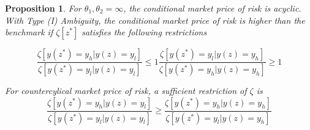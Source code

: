 \documentclass[12pt]{article}
\newtheorem{proposition}{Proposition}
\begin{document}
\begin{proposition}
\label{propo-7}
For $\theta_1,\theta_2=\infty$, the conditional market price of risk is acyclic. With Type (I) Ambiguity, the conditional market price of risk is higher than the benchmark if $\zeta[z^*]$ satisfies the following restrictions

\begin{subequations}
\label{eq:mprgreaterthanbenchmarkcondition}
\begin{equation}
	\frac{\zeta[y(z^*)=y_h|y(z)=y_l]}{\zeta[y(z^*)=y_l|y(z)=y_l]} \leq 1
\end{equation}
\begin{equation}
	\frac{\zeta[y(z^*)=y_l|y(z)=y_h]}{\zeta[y(z^*)=y_h|y(z)=y_h]} \geq 1
\end{equation}
\end{subequations}

For countercylical market price of risk, a sufficient restriction of $\zeta$ is
\begin{equation}
\label{eq:countercylicalmprcondition}
	\frac{\zeta[y(z^*)=y_h|y(z)=y_l]}{\zeta[y(z^*)=y_l|y(z)=y_l]}\geq	\frac{\zeta[y(z^*)=y_h|y(z)=y_h]}{\zeta[y(z^*)=y_l|y(z)=y_h]}
\end{equation}
\end{proposition}
\end{document}
